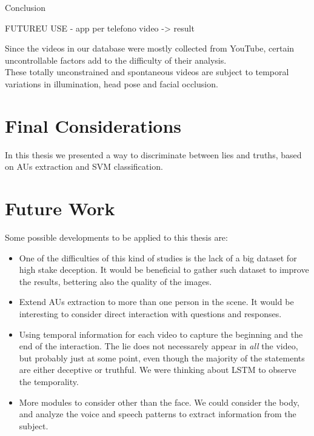 Conclusion

FUTUREU USE - app per telefono video -> result

 Since the videos in our database were mostly collected from YouTube, certain uncontrollable factors add to the difficulty of their analysis. \\
These totally unconstrained and spontaneous videos are subject to temporal variations in illumination, head pose and facial occlusion.

\section{Final Considerations}
In this thesis we presented a way to discriminate between lies and truths, based on AUs extraction and SVM classification.



\section{Future Work}
Some possible developments to be applied to this thesis are:
\begin{itemize}
	\item One of the difficulties of this kind of studies is the lack of a big dataset for high stake deception. It would be beneficial to gather such dataset to improve the results, bettering also the quality of the images.
	\item Extend AUs extraction to more than one person in the scene. It would be interesting to consider direct interaction with questions and responses. 
	\item Using temporal information for each video to capture the beginning and the end of the interaction. The lie does not necessarely appear in \textit{all} the video, but probably just at some point, even though the majority of the statements are either deceptive or truthful. We were thinking about LSTM to observe the temporality.
	\item More modules to consider other than the face. We could consider the body, and analyze the voice and speech patterns to extract information from the subject.
\end{itemize}